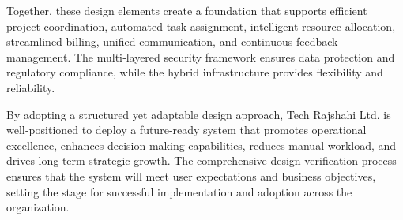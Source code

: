 \documentclass[12pt,a4paper]{article}
\begin{document}
Together, these design elements create a foundation that supports efficient project coordination, automated task assignment, intelligent resource allocation, streamlined billing, unified communication, and continuous feedback management.  The multi‑layered security framework ensures data protection and regulatory compliance, while the hybrid infrastructure provides flexibility and reliability.

By adopting a structured yet adaptable design approach, Tech Rajshahi Ltd. is well‑positioned to deploy a future‑ready system that promotes operational excellence, enhances decision‑making capabilities, reduces manual workload, and drives long‑term strategic growth.  The comprehensive design verification process ensures that the system will meet user expectations and business objectives, setting the stage for successful implementation and adoption across the organization.
\end{document}
